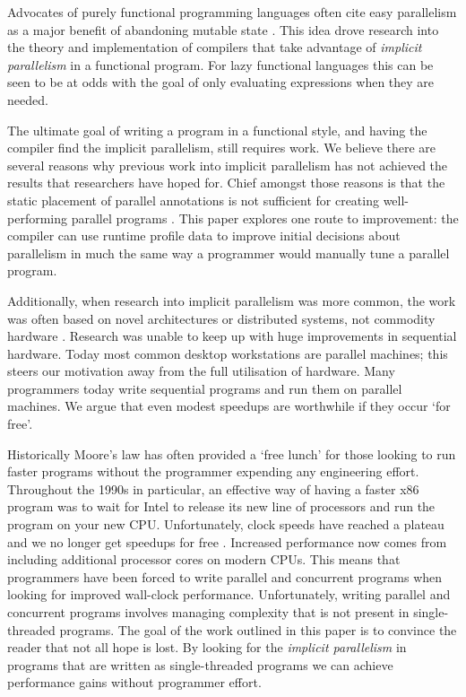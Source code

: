 Advocates of purely functional programming languages often cite easy
parallelism as a major benefit of abandoning mutable state \citep{hughes:thesis,
SPJ:PIFPL}. This idea drove research into the theory and implementation of
compilers that take advantage of \emph{implicit parallelism} in a functional
program. For lazy functional languages this can be seen to be at odds with the
goal of only evaluating expressions when they are needed. 

The ultimate goal of writing a program in a functional style, and having the
compiler find the implicit parallelism, still requires work.  We believe there
are several reasons why previous work into implicit parallelism has not
achieved the results that researchers have hoped for. Chief amongst those
reasons is that the static placement of parallel annotations is not sufficient
for creating well-performing parallel programs \citep{hammond2000research,
hogen1992automatic, tremblay1995impact, feedbackImplicit}. This paper explores
one route to improvement: the compiler can use runtime profile data to improve
initial decisions about parallelism in much the same way a programmer would
manually tune a parallel program.

Additionally, when research into implicit parallelism was more common, the work
was often based on novel architectures or distributed systems, not commodity
hardware \citep{GRIP, hammond2000research}. Research was unable to keep
up with huge improvements in sequential hardware. Today most common desktop
workstations are parallel machines; this steers
our motivation away from the full utilisation of hardware. Many programmers
today write sequential programs and run them on parallel machines. We
argue that even modest speedups are worthwhile if they occur `for free'.

Historically Moore's law has often provided a `free lunch' for those looking to
run faster programs without the programmer expending any engineering effort.
Throughout the 1990s in particular, an effective way of having a faster x86
program was to wait for Intel\texttrademark{} to release its new line of
processors and run the program on your new CPU. Unfortunately, clock speeds
have reached a plateau and we no longer get speedups for free
\citep{sutter2005free}. Increased performance now comes from including
additional processor cores on modern CPUs.  This means that programmers have
been forced to write parallel and concurrent programs when looking for improved
wall-clock performance. Unfortunately, writing parallel and concurrent programs
involves managing complexity that is not present in single-threaded programs.
The goal of the work outlined in this paper is to convince the reader that not
all hope is lost. By looking for the \emph{implicit parallelism} in programs
that are written as single-threaded programs we can achieve performance gains
without programmer effort.

